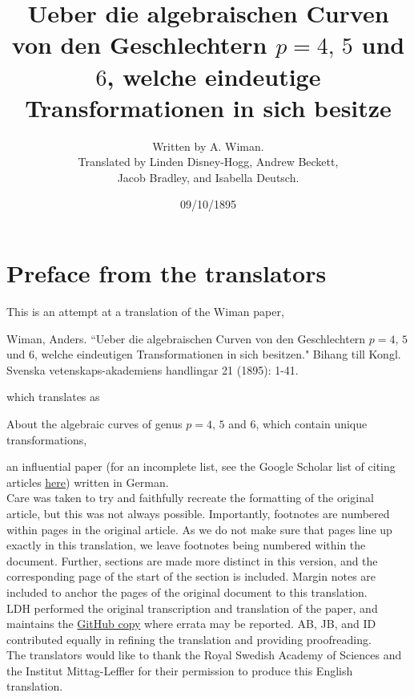 \documentclass[leqno]{article}
\title{Ueber die algebraischen Curven von den Geschlechtern $p = 4, \, 5$ und $6$, welche eindeutige Transformationen in sich besitze }
\author{Written by A. Wiman. \\
Translated by Linden Disney-Hogg, Andrew Beckett, \\
Jacob Bradley, and Isabella Deutsch.}
\date{09/10/1895}
\begin{document}
\maketitle

\section*{Preface from the translators}
This is an attempt at a translation of the Wiman paper,
\begin{center}
	Wiman, Anders. ``Ueber die algebraischen Curven von den Geschlechtern $p= 4, \, 5$ und $6$, welche eindeutigen Transformationen in sich besitzen."  Bihang till Kongl. Svenska vetenskaps-akademiens handlingar 21 (1895): 1-41.
\end{center}
which translates as 
\begin{center}
	About the algebraic curves of genus $p=4, \, 5$ and $6$, which contain unique transformations, 
\end{center}
 an influential paper (for an incomplete list, see the Google Scholar list of citing articles \href{https://scholar.google.com/scholar?start=0&hl=en&as_sdt=2005&sciodt=0,5&cites=15232192074326267713&scipsc=}{here}) written in German. \\
Care was taken to try and faithfully recreate the formatting of the original article, but this was not always possible. Importantly, footnotes are numbered within pages in the original article. As we do not make sure that pages line up exactly in this translation, we leave footnotes being numbered within the document. Further, sections are made more distinct in this version, and the corresponding page of the start of the section is included. Margin notes are included to anchor the pages of the original document to this translation. \\
LDH performed the original transcription and translation of the paper, and maintains the \href{https://github.com/DisneyHogg/Wiman-Translation}{GitHub copy} where errata may be reported. AB, JB, and ID contributed equally in refining the translation and providing proofreading. \\
The translators would like to thank the Royal Swedish Academy of Sciences and the Institut Mittag-Leffler for their permission to produce this English translation. 
\end{document}
